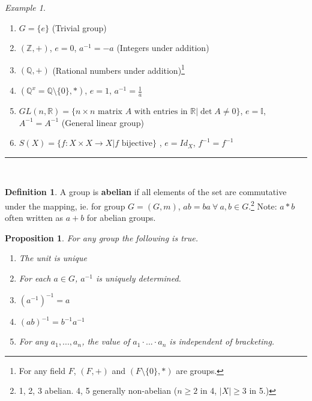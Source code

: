 \documentclass{article}
\newtheorem{theorem}{Proposition}[section]
\theoremstyle{definition}
\newtheorem{definition}{Definition}[section]
\theoremstyle{remark}
\newtheorem*{example}{Example}
\begin{document}
\begin{example}
~\\
\begin{enumerate}

\item \vspace{-2mm}$G=\lbrace e\rbrace$ (Trivial group)
\item $(\mathbb{Z}, +)$, $e=0$, $a^{-1}=-a$ (Integers under addition)
\item $(\mathbb{Q}, +)$ (Rational numbers under addition)\footnote{For any field $F$, $(F,+)$ and $(F\setminus\lbrace 0\rbrace, *)$ are groups.}
\item $(\mathbb{Q}^x=\mathbb{Q}\setminus \lbrace 0\rbrace, *)$, $e=1$, $a^{-1}=\frac{1}{a}$
\item $GL(n,\mathbb{R})= \lbrace n\times n \text{ matrix } A \text{ with entries in } \mathbb{R}|\det A \neq 0 \rbrace$, $e = \mathbb{I}$, $A^{-1}=A^{-1}$ (General linear group)
\item $S(X)=\lbrace f:X\times X \rightarrow X | f \text{ bijective}\rbrace$ , $ e=Id_X$, $f^{-1}=f^{-1}$ 
\end{enumerate}
\end{example}
\hrule
\vspace{3mm}~\\
\begin{definition}
A group is \textbf{abelian} if all elements of the set are commutative under the mapping, ie. for group $G=(G,m)$, $ab=ba~\forall~a,b\in G$.\footnote{1, 2, 3 abelian. 4, 5 generally non-abelian ($n\geq 2$ in 4, $|X| \geq 3$ in 5.)} Note: $a*b$ often written as $a+b$ for abelian groups.\\
\end{definition}
\begin{theorem} For any group the following is true.
\begin{enumerate}
\item The unit is unique
\item For each $a\in G$, $a^{-1}$ is uniquely determined.
\item $(a^{-1})^{-1}=a$
\item $(ab)^{-1}=b^{-1}a^{-1}$
\item For any $a_1, ..., a_n$, the value of $a_1\cdot ... \cdot a_n$ is independent of bracketing.
\end{enumerate}
\end{theorem}
\end{document}
